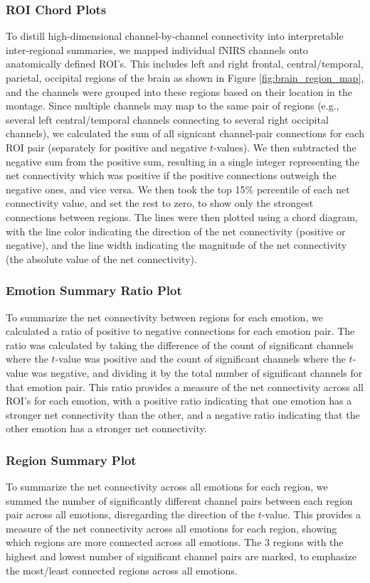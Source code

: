 \subsubsection{ROI Chord Plots}
To distill high-dimensional channel-by-channel connectivity into interpretable inter-regional summaries, we mapped individual fNIRS channels onto anatomically defined ROI's. 
This includes left and right frontal, central/temporal, parietal, occipital regions of the brain as shown in Figure \ref{fig:brain_region_map}, and the channels were grouped into these regions based on their location in the montage.
Since multiple channels may map to the same pair of regions (e.g., several left central/temporal channels connecting to several right occipital channels), we calculated the sum of all signicant channel-pair connections for each ROI pair (separately for positive and negative $t$-values). 
We then subtracted the negative sum from the positive sum, resulting in a single integer representing the net connectivity which was positive if the positive connections outweigh the negative ones, and vice versa.
We then took the top 15\% percentile of each net connectivity value, and set the rest to zero, to show only the strongest connections between regions.
The lines were then plotted using a chord diagram, with the line color indicating the direction of the net connectivity (positive or negative), and the line width indicating the magnitude of the net connectivity (the absolute value of the net connectivity).

\subsubsection{Emotion Summary Ratio Plot}
To summarize the net connectivity between regions for each emotion, we calculated a ratio of positive to negative connections for each emotion pair.
The ratio was calculated by taking the difference of the count of significant channels where the $t$-value was positive and the count of significant channels where the $t$-value was negative, and dividing it by the total number of significant channels for that emotion pair. 
This ratio provides a measure of the net connectivity across all ROI's for each emotion, with a positive ratio indicating that one emotion has a stronger net connectivity than the other, and a negative ratio indicating that the other emotion has a stronger net connectivity.

\subsubsection{Region Summary Plot}
To summarize the net connectivity across all emotions for each region, we summed the number of significantly different channel pairs between each region pair across all emotions, disregarding the direction of the $t$-value.
This provides a measure of the net connectivity across all emotions for each region, showing which regions are more connected across all emotions.
The 3 regions with the highest and lowest number of significant channel pairs are marked, to emphasize the most/least connected regions across all emotions.

